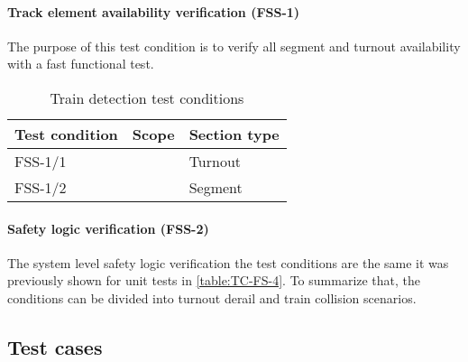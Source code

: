 \paragraph{Track element availability verification (FSS-1)} The purpose of this test condition is to verify all segment and turnout availability with a fast functional test. 
\begin{table}[H]
	\caption{Train detection test conditions}
	\label{table:TC-FSS-1}
	\begin{center}
		\renewcommand{\arraystretch}{1.8}
		\begin{tabu} 
			to 0.9 \textwidth
			{  X[c] X[c] X[c] }
			\toprule
			Test condition & Scope                      & Section type \\ \midrule
			FSS-1/1        &  & Turnout      \\
			FSS-1/2        &                            & Segment      \\ \bottomrule
		\end{tabu}
	\end{center}
\end{table} 
\paragraph{Safety logic verification (FSS-2)} The system level safety logic verification the test conditions are the same it was previously shown for unit tests in \autoref{table:TC-FS-4}. To summarize that, the conditions can be divided into turnout derail and train collision scenarios. 

\subsection{Test cases}
